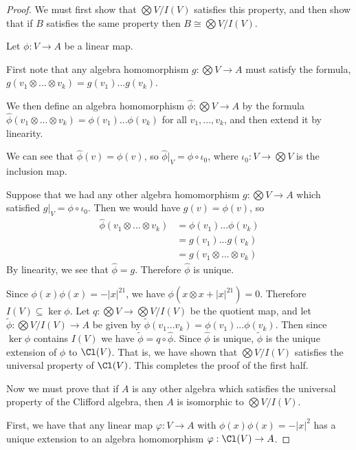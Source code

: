 \begin{proof}
    We must first show that $\bigotimes V/I(V)$ satisfies this property, and then show that if $B$ satisfies the same property then $B\cong \bigotimes V/I(V)$.

    Let $\phi:V\to A$ be a linear map. 
    
    First note that any algebra homomorphism $g : \bigotimes V \to A$ must satisfy the formula, $g(v_1\otimes...\otimes v_k) = g(v_1)...g(v_k)$.

    We then define an algebra homomorphism $\hat{\phi} : \bigotimes V \to A$  by the formula $\hat{\phi}(v_1\otimes...\otimes v_k) = \phi(v_1)...\phi(v_k)$ for all $v_1,...,v_k$, and then extend it by linearity. 
    
    We can see that $\hat{\phi}(v)=\phi(v)$, so $\hat{\phi}|_{V} = \phi\circ\iota_0$, where $\iota_0 : V \to \bigotimes V$ is the inclusion map.

    Suppose that we had any other algebra homomorphism $g : \bigotimes V \to A$ which satisfied $g|_V = \phi\circ \iota_0$. Then we would have $g(v) = \phi(v)$, so 
    \begin{align*}\hat{\phi}(v_1\otimes...\otimes v_k) &= \phi(v_1)...\phi(v_k) \\&= g(v_1)...g(v_k)\\&=g(v_1\otimes ...\otimes v_k)\end{align*}
    By linearity, we see that $\hat{\phi} = g$. Therefore $\hat{\phi}$ is unique.

    Since $\phi(x)\phi(x) = -|x|^21$, we have $\phi(x\otimes x + |x|^21) = 0$. Therefore $I(V) \subseteq \ker \phi$. Let $q : \bigotimes V \to \bigotimes V/I(V)$ be the quotient map, and let $\tilde{\phi} : \bigotimes V/I(V) \to A$ be given by $\tilde{\phi}(v_1...v_k) = \phi(v_1)...\phi(v_k)$. Then since $\ker \phi$ contains $I(V)$ we have $\tilde{\phi} = q\circ \hat{\phi}$. Since $\hat{\phi}$ is unique, $\tilde{\phi}$ is the unique extension of $\phi$ to $\Cl(V)$. That is, we have shown that $\bigotimes V/I(V)$ satisfies the universal property of $\Cl(V)$. This completes the proof of the first half.

    Now we must prove that if $A$ is any other algebra which satisfies the universal property of the Clifford algebra, then $A$ is isomorphic to $\bigotimes V/I(V)$.

    First, we have that any linear map $\varphi : V \to A$ with $\phi(x)\phi(x) = -|x|^2$ has a unique extension to an algebra homomorphism $\varphi : \Cl(V)\to A$.
\end{proof}
